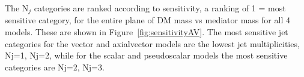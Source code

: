 %




%




The N$_{j}$ categories are ranked according to sensitivity, a ranking of 1 =  most sensitive category, for the entire plane of DM mass vs mediator mass for all 4 models. These are shown in Figure~\ref{fig:sensitivityAV}. The most sensitive jet categories for the vector and axialvector models are the lowest jet multiplicities, Nj=1, Nj=2, while for the scalar and pseudoscalar models the most sensitive categories are Nj=2, Nj=3. 

